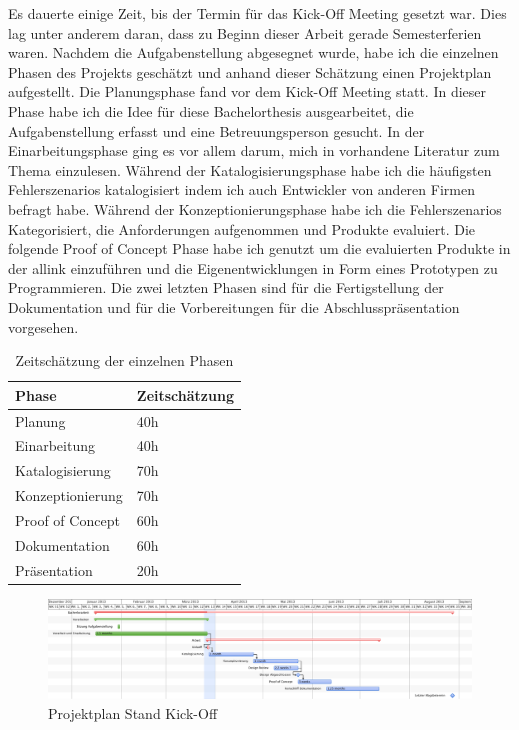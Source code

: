 
Es dauerte einige Zeit, bis der Termin für das Kick-Off Meeting gesetzt war. Dies lag unter anderem daran, dass zu Beginn dieser Arbeit gerade Semesterferien waren. Nachdem die Aufgabenstellung abgesegnet wurde, habe ich die einzelnen Phasen des Projekts geschätzt und anhand dieser Schätzung einen Projektplan aufgestellt. Die Planungsphase fand vor dem Kick-Off Meeting statt. In dieser Phase habe ich die Idee für diese Bachelorthesis ausgearbeitet, die Aufgabenstellung erfasst und eine Betreuungsperson gesucht. In der Einarbeitungsphase ging es vor allem darum, mich in vorhandene Literatur zum Thema einzulesen. Während der Katalogisierungsphase habe ich die häufigsten Fehlerszenarios katalogisiert indem ich auch Entwickler von anderen Firmen befragt habe. Während der Konzeptionierungsphase habe ich die Fehlerszenarios Kategorisiert, die Anforderungen aufgenommen und Produkte evaluiert. Die folgende Proof of Concept Phase habe ich genutzt um die evaluierten Produkte in der allink einzuführen und die Eigenentwicklungen in Form eines Prototypen zu Programmieren. Die zwei letzten Phasen sind für die Fertigstellung der Dokumentation und für die Vorbereitungen für die Abschlusspräsentation vorgesehen.

\begin{table}[h]
  \centering
  \begin{tabular}{ll}
  \toprule
    Phase & Zeitschätzung\\
  \hline
    Planung & 40h\\
  \hline
    Einarbeitung & 40h\\
  \hline
    Katalogisierung & 70h\\
  \hline
    Konzeptionierung & 70h\\
  \hline
    Proof of Concept & 60h\\
  \hline
    Dokumentation & 60h\\
  \hline
    Präsentation & 20h\\
  \bottomrule
  \end{tabular}
  \caption{Zeitschätzung der einzelnen Phasen}
  \label{tab:zeitschätzung}
\end{table}


\begin{figure}[p]
\centering
\includegraphics[width=1\textheight, angle=90]{images/projektplan.pdf}
\caption{Projektplan Stand Kick-Off}
\label{fig:projektplan}
\end{figure}

